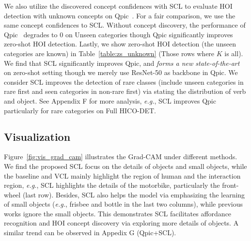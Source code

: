 \documentclass[runningheads]{llncs}
\newcommand{\eg}{\textit{e.g.}}
\begin{document}
We also utilize the discovered concept confidences with SCL to evaluate HOI detection with unknown concepts on Qpic~\cite{tamura_cvpr2021}. For a fair comparison, we use the same concept confidences to SCL. Without concept discovery, the performance of Qpic~\cite{tamura_cvpr2021} degrades to 0 on Unseen categories though Qpic significantly improves zero-shot HOI detection.
Lastly, we show zero-shot HOI detection (the unseen categories are known) in Table~\ref{table:zs_unknown} (Those rows where $K$ is all). We find that SCL significantly improves Qpic, and \textit{forms a new state-of-the-art} on zero-shot setting though we merely use ResNet-50 as backbone in Qpic. We consider SCL improves the detection of rare classes (include unseen categories in rare first and seen categories in non-rare first) via stating the distribution of verb and object. See Appendix F for more analysis, \eg, SCL improves Qpic particularly for rare categories on Full HICO-DET.



























\subsection{Visualization}

 Figure~\ref{fig:vis_grad_cam} illustrates the Grad-CAM under different methods. We find the proposed SCL focus on the details of objects and small objects, while the baseline and VCL mainly highlight the region of human and the interaction region, \eg, SCL highlights the details of the motorbike, particularly the front-wheel (last row). Besides, SCL also helps the model via emphasizing the learning of small objects (\eg, frisbee and bottle in the last two columns), while previous works ignore the small objects. This demonstrates SCL facilitates affordance recognition and HOI concept discovery via exploring more details of objects. A similar trend can be observed in Appedix G (Qpic+SCL).
\end{document}
